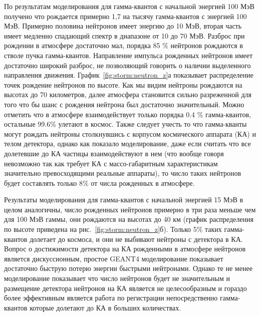 По результатам моделирования для гамма-квантов с начальной энергией 100 МэВ получено что рождается примерно 1,7 на тысячу гамма-квантов с энергией 100 МэВ. Примерно половина нейтронов имеет энергию до 10 МэВ, вторая часть имеет медленно спадающий спектр в диапазоне от 10 до 70 МэВ. Разброс при рождении в атмосфере достаточно мал, порядка 85 \% нейтронов рождаются в стволе пучка гамма-квантов. Направление импульса рожденных нейтронов имеет достаточно широкий разброс, не позволяющий говорить о наличии выделенного направления движения. График~\ref{fig:storm:neutron_z}а показывает распределение точек рождение нейтронов по высоте. Как мы видим нейтроны рождаются на высотах до 70 километров, далее атмосфера становится сильно разреженной для того что бы шанс с рождения нейтрона был достаточно значительный. Можно отметить что в атмосфере взаимодействует только порядка 0.4 \% гамма-квантов, остальные 99.6\% улетают в космос. Также следует учесть то что гамма-кванты могут рождать нейтроны столкнувшись с корпусом космического аппарата (КА) и телом детектора, однако как показало моделирование, даже если считать что все долетевшие до КА частицы взаимодействуют в нем (что вообще говоря невозможно так как требует КА с массо-габаритным характеристикам значительно превосходящими реальные аппараты), то число таких нейтронов будет составлять только 8\% от числа рожденных в атмосфере.

Результаты моделирования для гамма-квантов с начальной энергией 15 МэВ в целом аналогичны, число рожденных нейтронов примерно в три раза меньше чем для 100 МэВ гаммы, они рождаются на высотах до 40 км (график распределения по высоте приведена на рис.~\ref{fig:storm:neutron_z}б). Только 5\% таких гамма-квантов долетает до космоса, и они не выбивают нейтроны с детектора в КА. Вопрос о достижимости детектора на КА рожденными в атмосфере нейтронов  является дискуссионным, простое GEANT4 моделирование показывает достаточно быструю потерю энергии быстрыми нейтронами. Однако те не менее моделирование показывает что число нейтронов будет не значительным и размещение детектора нейтронов на КА является не целесообразным и гораздо более эффективным является работа по  регистрации непосредственно гамма-квантов которые долетают до КА в больших количествах.
